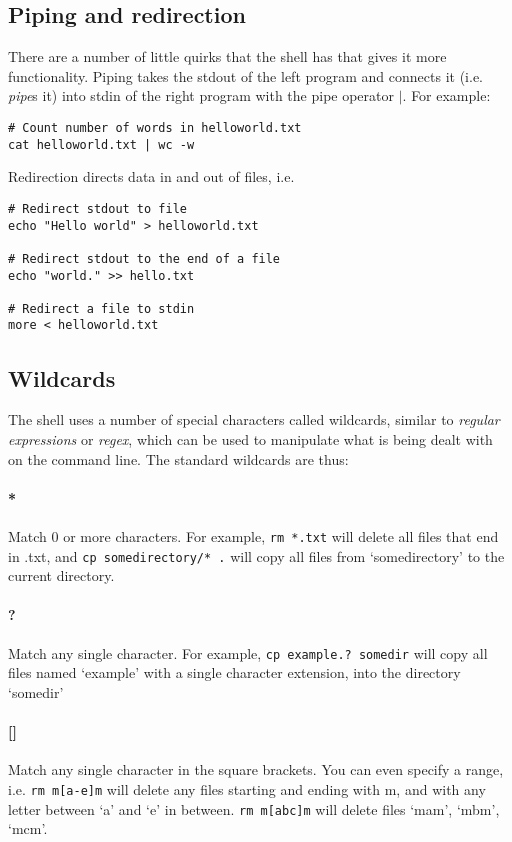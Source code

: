 \documentclass{article}
\begin{document}
\subsection{Piping and redirection}
There are a number of little quirks that the shell has that gives it more functionality.
Piping takes the stdout of the left program and connects it (i.e. \emph{pipe}s it) into stdin of the right program with the pipe operator $|$. For example:
\begin{verbatim}
# Count number of words in helloworld.txt
cat helloworld.txt | wc -w 
\end{verbatim}
Redirection directs data in and out of files, i.e. 
\begin{verbatim}
# Redirect stdout to file
echo "Hello world" > helloworld.txt

# Redirect stdout to the end of a file
echo "world." >> hello.txt

# Redirect a file to stdin
more < helloworld.txt
\end{verbatim}

\subsection{Wildcards}
The shell uses a number of special characters called wildcards, similar to \emph{regular expressions} or \emph{regex}, which can be used to manipulate what is being dealt with on the command line. The standard wildcards are thus:
\paragraph{*}
Match 0 or more characters. For example, \texttt{rm *.txt} will delete all files that end in .txt, and \texttt{cp somedirectory/* .} will copy all files from `somedirectory' to the current directory.
\paragraph{?}
Match any single character. For example, \texttt{cp example.? somedir} will copy all files named `example' with a single character extension, into the directory `somedir' 
\paragraph{[]}
Match any single character in the square brackets. You can even specify a range, i.e. \texttt{rm m[a-e]m} will delete any files starting and ending with m, and with any letter between `a' and `e' in between. \texttt{rm m[abc]m} will delete files `mam', `mbm', `mcm'.
\end{document}
